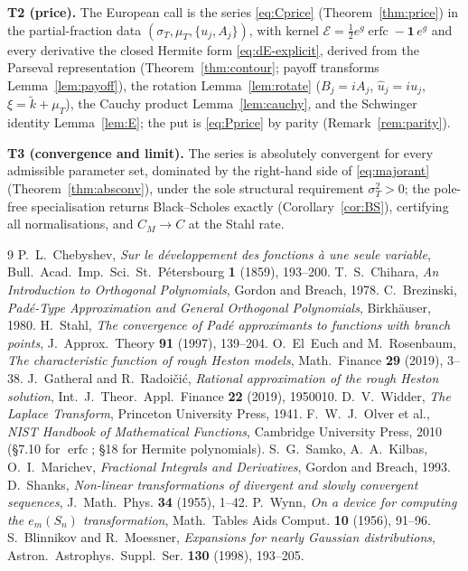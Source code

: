 \documentclass[11pt]{article}
\DeclareMathOperator{\erfc}{erfc}
\begin{document}
\textbf{T2 (price).} The European call is the series \eqref{eq:Cprice}
(Theorem~\ref{thm:price}) in the partial-fraction data
$(\sigma_T,\mu_T,\{u_j,A_j\})$, with kernel
$\mathcal E=\tfrac12 e^{g}\erfc-\mathbf1\,e^{g}$ and every derivative the
closed Hermite form \eqref{eq:dE-explicit}, derived from the Parseval
representation (Theorem~\ref{thm:contour}; payoff transforms
Lemma~\ref{lem:payoff}), the rotation Lemma~\ref{lem:rotate} ($B_j=iA_j$,
$\hat u_j=iu_j$, $\xi=\tilde k+\mu_T$), the Cauchy product
Lemma~\ref{lem:cauchy}, and the Schwinger identity Lemma~\ref{lem:E}; the
put is \eqref{eq:Pprice} by parity (Remark~\ref{rem:parity}).

\textbf{T3 (convergence and limit).} The series is absolutely convergent for
every admissible parameter set, dominated by the right-hand side of
\eqref{eq:majorant} (Theorem~\ref{thm:absconv}), under the sole structural
requirement $\sigma_T^2>0$; the pole-free specialisation returns
Black--Scholes exactly (Corollary~\ref{cor:BS}), certifying all
normalisations, and $C_M\to C$ at the Stahl rate.

\begin{thebibliography}{9}
 P.~L.~Chebyshev, \emph{Sur le d\'eveloppement des fonctions \`a une seule variable}, Bull.~Acad.~Imp.~Sci.~St.~P\'etersbourg \textbf{1} (1859), 193--200.
 T.~S.~Chihara, \emph{An Introduction to Orthogonal Polynomials}, Gordon and Breach, 1978.
 C.~Brezinski, \emph{Pad\'e-Type Approximation and General Orthogonal Polynomials}, Birkh\"auser, 1980.
 H.~Stahl, \emph{The convergence of Pad\'e approximants to functions with branch points}, J.~Approx.~Theory \textbf{91} (1997), 139--204.
 O.~El~Euch and M.~Rosenbaum, \emph{The characteristic function of rough Heston models}, Math.~Finance \textbf{29} (2019), 3--38.
 J.~Gatheral and R.~Radoi\v{c}i\'c, \emph{Rational approximation of the rough Heston solution}, Int.~J.~Theor.~Appl.~Finance \textbf{22} (2019), 1950010.
 D.~V.~Widder, \emph{The Laplace Transform}, Princeton University Press, 1941.
 F.~W.~J.~Olver et al., \emph{NIST Handbook of Mathematical Functions}, Cambridge University Press, 2010 (\S7.10 for $\erfc$; \S18 for Hermite polynomials).
 S.~G.~Samko, A.~A.~Kilbas, O.~I.~Marichev, \emph{Fractional Integrals and Derivatives}, Gordon and Breach, 1993.
 D.~Shanks, \emph{Non-linear transformations of divergent and slowly convergent sequences}, J.~Math.~Phys. \textbf{34} (1955), 1--42.
 P.~Wynn, \emph{On a device for computing the $e_m(S_n)$ transformation}, Math.~Tables Aids Comput. \textbf{10} (1956), 91--96.
 S.~Blinnikov and R.~Moessner, \emph{Expansions for nearly Gaussian distributions}, Astron.~Astrophys.~Suppl.~Ser. \textbf{130} (1998), 193--205.
\end{thebibliography}
\end{document}
